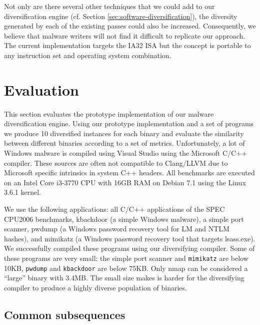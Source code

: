 \documentclass[letterpaper,twocolumn,10pt]{article}
\begin{document}
Not only are there several other techniques that we could add to our
diversification engine (cf. Section \ref{sec:software-diversification}), the
diversity generated by each of the existing passes could also be increased.
Consequently, we believe that malware writers will not find it difficult to
replicate our approach. The current implementation targets the IA32 ISA but the
concept is portable to any instruction set and operating system combination.



\section{Evaluation}

This section evaluates the prototype implementation of our malware
diversification engine. Using our prototype implementation and a set of
programs we produce 10 diversified instances for each binary and evaluate the
similarity between different binaries according to a set of metrics.
Unfortunately, a lot of Windows malware is compiled using Visual Studio using
the Microsoft C/C++ compiler. These sources are often not compatible to
Clang/LLVM due to Microsoft specific intrinsics in system C++ headers.  All
benchmarks are executed on an Intel Core i3-3770 CPU with 16GB RAM on Debian 7.1
using the Linux 3.6.1 kernel.

We use the following applications: all C/C++ applications of the SPEC CPU2006
benchmarks, kbackdoor (a simple Windows malware), %
a simple port scanner, pwdump (a Windows password recovery tool for LM and NTLM
hashes), and mimikatz (a Windows password recovery tool that targets lsass.exe).
We successfully compiled these programs using our diversifying compiler. Some
of these programs are very small: the simple port scanner and {\tt mimikatz} are
below 10KB, {\tt pwdump} and {\tt kbackdoor} are below 75KB. Only nmap can be
considered a ``large'' binary with 3.4MB. The small size makes is harder for the
diversifying compiler to produce a highly diverse population of binaries.


\subsection{Common subsequences}\label{sec:csub}
\end{document}
